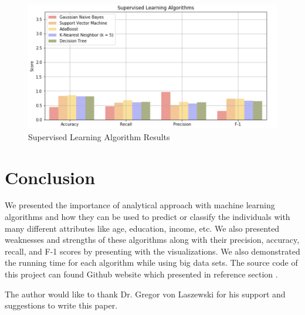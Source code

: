 \documentclass[sigconf]{acmart}
\begin{document}
\begin{figure}[!ht]
  \centering
      \includegraphics[width=\columnwidth]{images/result-score.png}
  \caption{Supervised Learning Algorithm Results \cite{Borga2017}}\label{fig:result-algo}
\end{figure}


\section{Conclusion}

We presented the importance of analytical approach with machine learning algorithms and how they can be used to predict or classify the individuals with many different attributes like age, education, income, etc. We also presented weaknesses and strengths of these algorithms along with their precision, accuracy, recall, and F-1 scores by presenting with the visualizations. We also demonstrated the running time for each algorithm while using big data sets. The source code of this project can found Github website which presented in reference section \cite{Borga2017}.





\begin{acks}

The author would like to thank Dr. Gregor von Laszewski for his support and suggestions to write this paper.

\end{acks}


 
\end{document}
